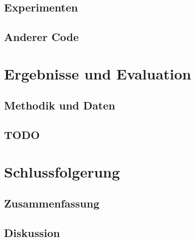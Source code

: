 \documentclass[12pt,a4paper,twoside]{scrartcl}
\numberwithin{equation}{section}
\newcounter{mypagecount}%
\newenvironment{interlude}{%
  \clearpage
  \setcounter{mypagecount}{\value{page}}%
  \thispagestyle{empty}%
  \pagestyle{empty}%
}{%
  \clearpage
  \setcounter{page}{\value{mypagecount}}%
}
\begin{document}
  	\subsection{Experimenten}\label{subsec:experimenten}
  	\subsection{Anderer Code}\label{subsec:andererCode}
\clearpage

\section{Ergebnisse und Evaluation}\label{sec:ergebnisseEvaluation}
  	\subsection{Methodik und Daten}\label{subsec:methodikDaten}
  	\subsection{TODO}\label{subsec:todo} %
\clearpage

\section{Schlussfolgerung}\label{sec:schlussfolgerung}
  	\subsection{Zusammenfassung}\label{subsec:zusammenfassung}
  	\subsection{Diskussion}\label{subsec:diskussion}
\clearpage
	

\begin{interlude}
  
  \begin{appendices}
   
  \end{appendices}
  \clearpage
  
  
\end{interlude}
\end{document}
